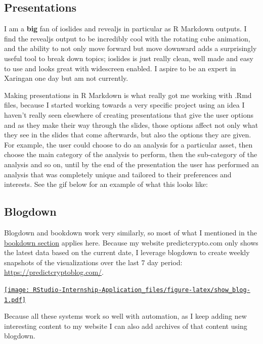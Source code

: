 \documentclass[
]{book}
\begin{document}
\hypertarget{presentations}{%
\subsection{Presentations}\label{presentations}}

I am a \textbf{big} fan of ioslides and revealjs in particular as R Markdown outputs. I find the revealjs output to be incredibly cool with the rotating cube animation, and the ability to not only move forward but move downward adds a surprisingly useful tool to break down topics; ioslides is just really clean, well made and easy to use and looks great with widescreen enabled. I aspire to be an expert in Xaringan one day but am not currently.

Making presentations in R Markdown is what really got me working with .Rmd files, because I started working towards a very specific project using an idea I haven't really seen elsewhere of creating presentations that give the user options and as they make their way through the slides, those options affect not only what they see in the slides that come afterwards, but also the options they are given. For example, the user could choose to do an analysis for a particular asset, then choose the main category of the analysis to perform, then the sub-category of the analysis and so on, until by the end of the presentation the user has performed an analysis that was completely unique and tailored to their preferences and interests. See the gif below for an example of what this looks like:

\hypertarget{blogdown}{%
\subsection{Blogdown}\label{blogdown}}

Blogdown\citep{R-blogdown} and bookdown work very similarly, so most of what I mentioned in the \protect\hyperlink{bookdown}{bookdown section} applies here. Because my website predictcrypto.com only shows the latest data based on the current date, I leverage blogdown to create weekly snapshots of the visualizations over the last 7 day period: \url{https://predictcryptoblog.com/}.

\href{https://predictcryptoblog.com/}{\texttt{[image: RStudio-Internship-Application\_files/figure-latex/show\_blog-1.pdf]}}

Because all these systems work so well with automation, as I keep adding new interesting content to my website I can also add archives of that content using blogdown.
\end{document}
